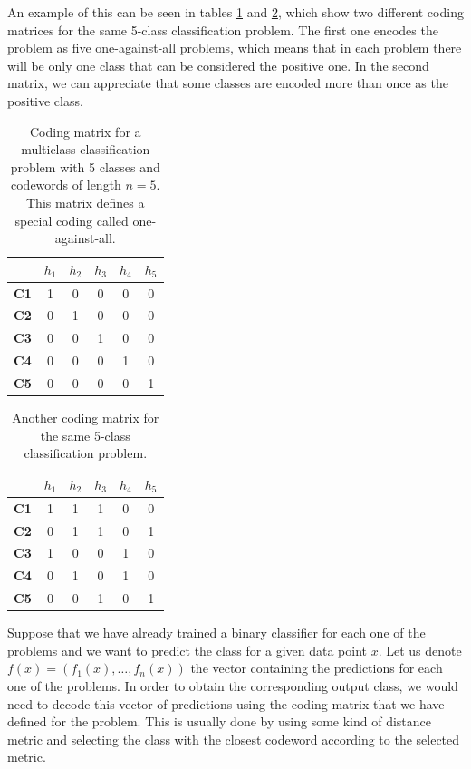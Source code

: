 An example of this can be seen in tables \ref{tab:ecoc_example_identity} and \ref{tab:ecoc_example_complex},
which show two different coding matrices for the same 5-class classification problem. The first one encodes the
problem as five one-against-all problems, which means that in each problem there will be only one class that can be
considered the positive one. In the second matrix, we can appreciate that some classes are encoded more than
once as the positive class.

\begin{table}[H]
\centering
\begin{tabular}{c|ccccc}
            & $h_1$ & $h_2$ & $h_3$ & $h_4$ & $h_5$ \\ \hline
\textbf{C1} & 1     & 0     & 0     & 0     & 0     \\
\textbf{C2} & 0     & 1     & 0     & 0     & 0     \\
\textbf{C3} & 0     & 0     & 1     & 0     & 0     \\
\textbf{C4} & 0     & 0     & 0     & 1     & 0     \\
\textbf{C5} & 0     & 0     & 0     & 0     & 1    
\end{tabular}%
\caption{Coding matrix for a multiclass classification problem with 5 classes and codewords of length $n=5$.
This matrix defines a special coding called one-against-all.}
\label{tab:ecoc_example_identity}
\end{table}


\begin{table}[H]
\centering
\begin{tabular}{c|ccccc}
            & $h_1$ & $h_2$ & $h_3$ & $h_4$ & $h_5$ \\ \hline
\textbf{C1} & 1     & 1     & 1     & 0     & 0     \\
\textbf{C2} & 0     & 1     & 1     & 0     & 1     \\
\textbf{C3} & 1     & 0     & 0     & 1     & 0     \\
\textbf{C4} & 0     & 1     & 0     & 1     & 0     \\
\textbf{C5} & 0     & 0     & 1     & 0     & 1    
\end{tabular}
\caption{Another coding matrix for the same 5-class classification problem.}
\label{tab:ecoc_example_complex}
\end{table}

Suppose that we have already trained a binary classifier for each one of the problems and we want to
predict the class for a given data point $x$. Let us denote $f(x) = (f_1(x), \dots, f_n(x))$ the
vector containing the predictions for each one of the problems. In order to obtain the corresponding output
class, we would need to decode this vector of predictions using the coding matrix that we have defined
for the problem. This is usually done by using some kind of distance metric and selecting the class with
the closest codeword according to the selected metric.

